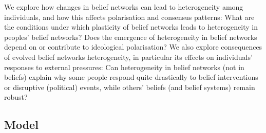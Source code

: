 We explore how changes in belief networks can lead to heterogeneity among individuals, and how this affects polarisation and consensus patterns: What are the conditions under which plasticity of belief networks leads to heterogeneity in peoples' belief networks? Does the emergence of heterogeneity in belief networks depend on or contribute to ideological polarisation? We also explore consequences of evolved belief networks heterogeneity, in particular its effects on individuals' responses to external pressures: Can heterogeneity in belief networks (not in beliefs) explain why some people respond quite drastically to belief interventions or disruptive (political) events, while others' beliefs (and belief systems) remain robust? 

\subsection*{Model}

